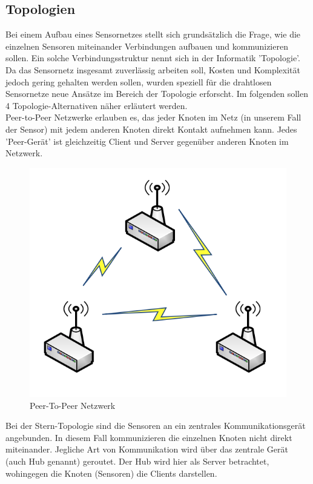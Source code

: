 \subsection{Topologien}\label{ss:Topologien}

Bei einem Aufbau eines Sensornetzes stellt sich grundsätzlich die Frage, wie die einzelnen Sensoren miteinander Verbindungen aufbauen und kommunizieren sollen. Ein solche Verbindungsstruktur nennt sich in der Informatik 'Topologie'. Da das Sensornetz insgesamt zuverlässig arbeiten soll, Kosten und Komplexität jedoch gering gehalten werden sollen, wurden speziell für die drahtlosen Sensornetze neue Ansätze im Bereich der Topologie erforscht. Im folgenden sollen 4 Topologie-Alternativen näher erläutert werden. \\

Peer-to-Peer Netzwerke erlauben es, das jeder Knoten im Netz (in unserem Fall der Sensor) mit jedem anderen Knoten direkt Kontakt aufnehmen kann. Jedes 'Peer-Gerät' ist gleichzeitig Client und Server gegenüber anderen Knoten im Netzwerk.\\

\begin{figure}[H] 
	\centering
	\includegraphics[scale=0.5]{Bilder/peertopeer}
	\caption{Peer-To-Peer Netzwerk\cite{d:kosmerchock}}
	\label{f:peertopeer}
\end{figure}

Bei der Stern-Topologie sind die Sensoren an ein zentrales Kommunikationsgerät angebunden. In diesem Fall kommunizieren die einzelnen Knoten nicht direkt miteinander. Jegliche Art von Kommunikation wird über das zentrale Gerät (auch Hub genannt) geroutet. Der Hub wird hier als Server betrachtet, wohingegen die Knoten (Sensoren) die Clients darstellen. \\

